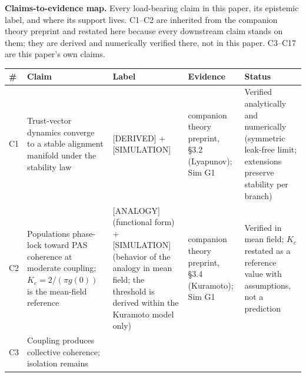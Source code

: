 \documentclass[
]{article}
\newcounter{none} %
\begin{document}
\textbf{Claims-to-evidence map.} Every load-bearing claim in this paper,
its epistemic label, and where its support lives. C1--C2 are inherited
from the companion theory preprint and restated here because every
downstream claim stands on them; they are derived and numerically
verified there, not in this paper. C3--C17 are this paper's own claims.

{\def\LTcaptype{none} %
\begin{longtable}[]{@{}
  >{\raggedright\arraybackslash}p{}
  >{\raggedright\arraybackslash}p{}
  >{\raggedright\arraybackslash}p{}
  >{\raggedright\arraybackslash}p{}
  >{\raggedright\arraybackslash}p{}@{}}
\toprule\noalign{}
\begin{minipage}[b]{\linewidth}\raggedright
\#
\end{minipage} & \begin{minipage}[b]{\linewidth}\raggedright
Claim
\end{minipage} & \begin{minipage}[b]{\linewidth}\raggedright
Label
\end{minipage} & \begin{minipage}[b]{\linewidth}\raggedright
Evidence
\end{minipage} & \begin{minipage}[b]{\linewidth}\raggedright
Status
\end{minipage} \\
\midrule\noalign{}
\endhead
\bottomrule\noalign{}
\endlastfoot
C1 & Trust-vector dynamics converge to a stable alignment manifold under
the stability law & {[}DERIVED{]} + {[}SIMULATION{]} & companion theory
preprint, §3.2 (Lyapunov); Sim G1 & Verified analytically and
numerically (symmetric leak-free limit; extensions preserve stability
per branch) \\
C2 & Populations phase-lock toward PAS coherence at moderate coupling;
\(K_c = 2/(\pi g(0))\) is the mean-field reference & {[}ANALOGY{]}
(functional form) + {[}SIMULATION{]} (behavior of the analogy in mean
field; the threshold is derived within the Kuramoto model only) &
companion theory preprint, §3.4 (Kuramoto); Sim G1 & Verified in mean
field; \(K_c\) restated as a reference value with assumptions, not a
prediction \\
C3 & Coupling produces collective coherence; isolation remains

\end{longtable}}
\end{document}

